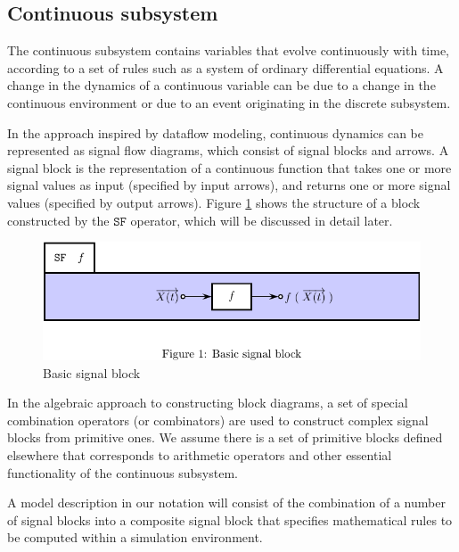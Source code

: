 \documentclass[a4paper]{article}
\begin{document}
\subsection{Continuous subsystem}

The continuous subsystem contains variables that evolve
continuously with time, according to a set of rules such as a system
of ordinary differential equations. A change in the dynamics of a
continuous variable can be due to a change in the continuous
environment or due to an event originating in the discrete
subsystem.

In the approach inspired by dataflow modeling, continuous dynamics
can be represented as signal flow diagrams, which consist of signal
blocks and arrows. A signal block is the representation of a
continuous function that takes one or more signal values as
input (specified by input arrows), and returns one or more signal
values (specified by output arrows).
Figure \ref{Fig:SignalBlock} shows the structure of a block
constructed by the $\texttt{SF}$ operator, which will be discussed
in detail later.

\begin{figure}
\includegraphics{figures/BasicSignalBlock}
\caption{\label{Fig:SignalBlock}Basic signal block}
\end{figure}

In the algebraic approach to constructing block diagrams, a set of
special combination operators (or combinators) are used to construct
complex signal blocks from primitive ones. We assume there is a set of
primitive blocks defined elsewhere that corresponds to arithmetic
operators and other essential functionality of the continuous
subsystem.

A model description in our notation will consist of the
combination of a number of signal blocks into a composite signal block
that specifies mathematical rules to be computed within a simulation
environment.
\end{document}
